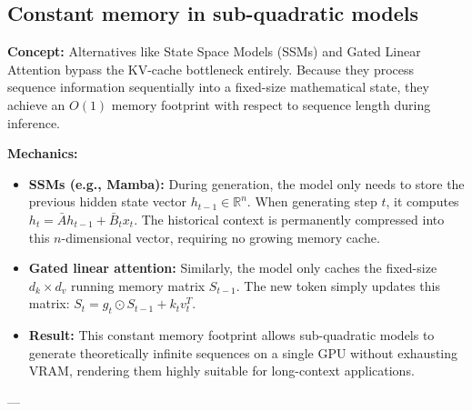 \documentclass[11pt]{article}
\begin{document}
	\subsection{Constant memory in sub-quadratic models}
	\textbf{Concept:} Alternatives like State Space Models (SSMs) and Gated Linear Attention bypass the KV-cache bottleneck entirely. Because they process sequence information sequentially into a fixed-size mathematical state, they achieve an $O(1)$ memory footprint with respect to sequence length during inference.
	
	\textbf{Mechanics:}
	\begin{itemize}
		\item \textbf{SSMs (e.g., Mamba):} During generation, the model only needs to store the previous hidden state vector $h_{t-1} \in \mathbb{R}^n$. When generating step $t$, it computes $h_t = \bar{A} h_{t-1} + \bar{B}_t x_t$. The historical context is permanently compressed into this $n$-dimensional vector, requiring no growing memory cache.
		\item \textbf{Gated linear attention:} Similarly, the model only caches the fixed-size $d_k \times d_v$ running memory matrix $S_{t-1}$. The new token simply updates this matrix: $S_t = g_t \odot S_{t-1} + k_t v_t^T$.
		\item \textbf{Result:} This constant memory footprint allows sub-quadratic models to generate theoretically infinite sequences on a single GPU without exhausting VRAM, rendering them highly suitable for long-context applications.
	\end{itemize}
	
	---
	
\end{document}
